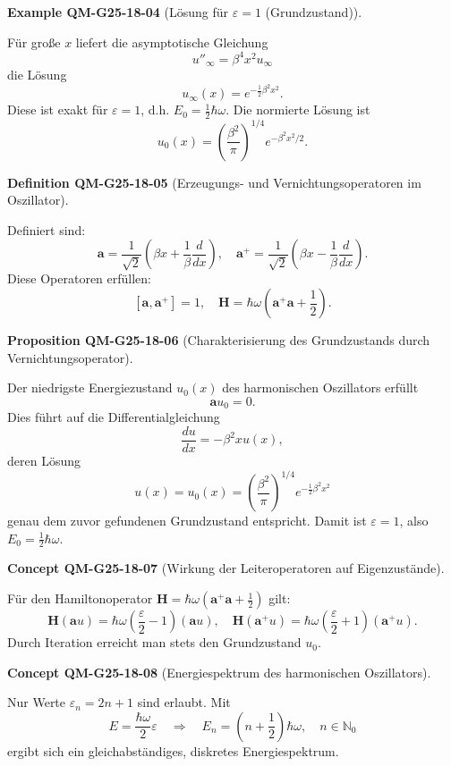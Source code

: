 \documentclass[10pt, letterpaper]{article}
\newcommand{\CustomHeading}[3]{%
  \par\medskip\noindent%
  \textbf{#1 #2} \textnormal{(#3)}.\enskip%
}
\newenvironment{DEF}[2]{\CustomHeading{Definition}{#1}{#2}}{}
\newenvironment{PROP}[2]{\CustomHeading{Proposition}{#1}{#2}}{}
\newenvironment{EXA}[2]{\CustomHeading{Example}{#1}{#2}}{}
\newenvironment{CONC}[2]{\CustomHeading{Concept}{#1}{#2}}{}
\begin{document}
\begin{EXA}{QM-G25-18-04}{Lösung für $\varepsilon = 1$ (Grundzustand)}
Für große $x$ liefert die asymptotische Gleichung
\[
u''_\infty = \beta^4 x^2 u_\infty
\]
die Lösung
\[
u_\infty(x) = e^{-\frac{1}{2}\beta^2 x^2}.
\]
Diese ist exakt für $\varepsilon = 1$, d.h. $E_0 = \frac{1}{2}\hbar\omega$. Die normierte Lösung ist
\[
u_0(x) = \left(\frac{\beta^2}{\pi}\right)^{1/4} e^{-\beta^2 x^2 / 2}.
\]
\end{EXA}

\begin{DEF}{QM-G25-18-05}{Erzeugungs- und Vernichtungsoperatoren im Oszillator}
Definiert sind:
\[
\mathbf{a} = \frac{1}{\sqrt{2}} \left( \beta x + \frac{1}{\beta} \frac{d}{dx} \right), \quad
\mathbf{a}^+ = \frac{1}{\sqrt{2}} \left( \beta x - \frac{1}{\beta} \frac{d}{dx} \right).
\]
Diese Operatoren erfüllen:
\[
[\mathbf{a}, \mathbf{a}^+] = 1, \quad \mathbf{H} = \hbar\omega\left( \mathbf{a}^+ \mathbf{a} + \frac{1}{2} \right).
\]
\end{DEF}

\begin{PROP}{QM-G25-18-06}{Charakterisierung des Grundzustands durch Vernichtungsoperator}
Der niedrigste Energiezustand $u_0(x)$ des harmonischen Oszillators erfüllt
\[
\mathbf{a} u_0 = 0.
\]
Dies führt auf die Differentialgleichung
\[
\frac{du}{dx} = -\beta^2 x u(x),
\]
deren Lösung
\[
u(x) = u_0(x) = \left(\frac{\beta^2}{\pi}\right)^{1/4} e^{-\frac{1}{2} \beta^2 x^2}
\]
genau dem zuvor gefundenen Grundzustand entspricht. Damit ist $\varepsilon = 1$, also $E_0 = \frac{1}{2} \hbar \omega$.
\end{PROP}

\begin{CONC}{QM-G25-18-07}{Wirkung der Leiteroperatoren auf Eigenzustände}
Für den Hamiltonoperator $\mathbf{H} = \hbar\omega(\mathbf{a}^+ \mathbf{a} + \frac{1}{2})$ gilt:
\[
\mathbf{H}(\mathbf{a} u) = \hbar\omega \left( \frac{\varepsilon}{2} - 1 \right) (\mathbf{a} u), \quad
\mathbf{H}(\mathbf{a}^+ u) = \hbar\omega \left( \frac{\varepsilon}{2} + 1 \right) (\mathbf{a}^+ u).
\]
Durch Iteration erreicht man stets den Grundzustand $u_0$.
\end{CONC}

\begin{CONC}{QM-G25-18-08}{Energiespektrum des harmonischen Oszillators}
Nur Werte $\varepsilon_n = 2n + 1$ sind erlaubt. Mit
\[
E = \frac{\hbar\omega}{2} \varepsilon \quad \Rightarrow \quad
E_n = \left( n + \frac{1}{2} \right) \hbar \omega, \quad n \in \mathbb{N}_0
\]
ergibt sich ein gleichabständiges, diskretes Energiespektrum.
\end{CONC}
\end{document}
